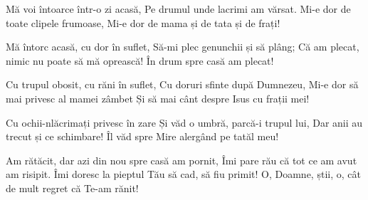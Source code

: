 \beginverse
Mă voi întoarce într-o zi acasă,
Pe drumul unde lacrimi am vărsat.
Mi-e dor de toate clipele frumoase,
Mi-e dor de mama și de tata și de frați!
\endverse

\beginchorus
Mă întorc acasă, cu dor în suflet,
Să-mi plec genunchii și să plâng;
Că am plecat, nimic nu poate să mă oprească!
În drum spre casă am plecat!
\endchorus

\beginverse
Cu trupul obosit, cu răni în suflet,
Cu doruri sfinte după Dumnezeu,
Mi-e dor să mai privesc al mamei zâmbet
Și să mai cânt despre Isus cu frații mei!
\endverse

\beginverse
Cu ochii-nlăcrimați privesc în zare
Și văd o umbră, parcă-i trupul lui,
Dar anii au trecut și ce schimbare!
Îl văd spre Mire alergând pe tatăl meu!
\endverse

\beginverse*
Am rătăcit, dar azi din nou spre casă am pornit,
Îmi pare rău că tot ce am avut am risipit.
Îmi doresc la pieptul Tău să cad, să fiu primit!
O, Doamne, știi, o, cât de mult regret că Te-am rănit!
\endverse
\endsong